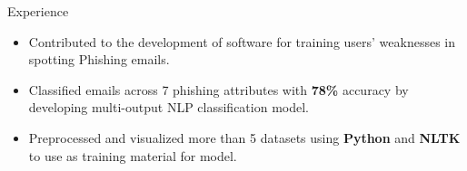 \documentclass{resume} %
\begin{document}
\begin{workSection}{Experience}
   \experienceItem[
   company=UTEP,
   location=El Paso{,} TX,
   position=Volunteer Researcher,
   duration=August 2023 {-} October 2023
   ]
   \begin{itemize}
   \vspace{-0.5em}
   \itemsep -6pt {}
   \item Contributed to the development of software for training users' weaknesses in spotting Phishing emails.
   \item Classified emails across 7 phishing attributes 
   with \textbf{78\%} accuracy by developing multi-output NLP classification model.
   \item Preprocessed and visualized more than 5 datasets using \textbf{Python} and \textbf{NLTK} to use as training material for model.
   \end{itemize}

\end{workSection}
\end{document}
